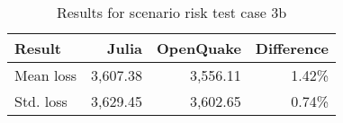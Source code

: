 \begin{table}[h]

\centering
\begin{tabular}{ l r r r }

\hline
\rowcolor{anti-flashwhite}
\bf{Result} & \bf{Julia} & \bf{OpenQuake} & \bf{Difference}\\
\hline
Mean loss & 3,607.38 & 3,556.11 & 1.42\% \\
Std. loss & 3,629.45 & 3,602.65 & 0.74\% \\
\hline
\end{tabular}

\caption{Results for scenario risk test case 3b}
\label{tab:result-sr-3b}
\end{table}